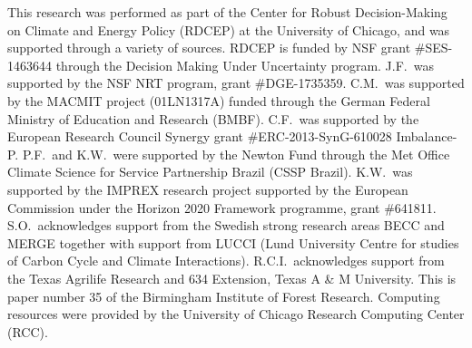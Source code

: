 \documentclass[gmd, manuscript]{copernicus} %
\providecommand{\DIFaddbegin}{} %
\providecommand{\DIFdelend}{} %
\begin{document}

\DIFdelend \begin{acknowledgements}
    This research was performed as part of the Center for Robust 
    Decision-Making on Climate and Energy Policy (RDCEP) at the University 
    of Chicago, and was supported through a variety of sources.
    RDCEP is funded by NSF grant \#SES-1463644 through the Decision Making 
    Under Uncertainty program.
    J.F.\ was supported by the NSF NRT program, grant \#DGE-1735359.
    C.M.\ was supported by the MACMIT project (01LN1317A) funded through the 
    German Federal Ministry of Education and Research (BMBF).
    C.F.\ was supported by the European Research Council Synergy grant 
    \#ERC-2013-SynG-610028 Imbalance-P.
    P.F.\ and K.W.\ were supported  by the Newton Fund through the Met 
    Office Climate Science for Service Partnership Brazil (CSSP Brazil).
    K.W.\ was supported by the IMPREX research project supported by the 
    European Commission under the Horizon 2020 Framework programme, grant 
    \#641811.
    S.O.\ acknowledges support from the Swedish strong research areas BECC 
    and MERGE together with support from LUCCI (Lund University Centre for 
    studies of Carbon Cycle and Climate Interactions).
    R.C.I.\ acknowledges support from the Texas Agrilife Research and 634 
    Extension, Texas A \& M University.
    This is paper number 35 of the Birmingham Institute of Forest Research.
    Computing resources were provided by the University of Chicago Research 
    Computing Center (RCC).
\end{acknowledgements}
    \DIFaddbegin 


\end{document}
